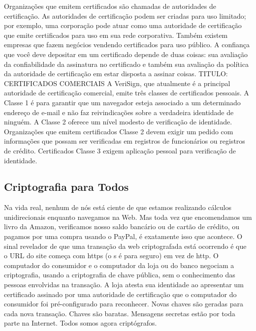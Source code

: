 \documentclass{book}
\begin{document}
Organizações que emitem certificados são chamadas de autoridades de certificação. As autoridades de certificação podem ser criadas para uso limitado; por exemplo, uma corporação pode atuar como uma autoridade de certificação que emite certificados para uso em sua rede corporativa. Também existem empresas que fazem negócios vendendo certificados para uso público. A confiança que você deve depositar em um certificado depende de duas coisas: sua avaliação da confiabilidade da assinatura no certificado e também sua avaliação da política da autoridade de certificação em estar disposta a assinar coisas.
TITULO: CERTIFICADOS COMERCIAIS
A VeriSign, que atualmente é a principal autoridade de certificação comercial, emite três classes de certificados pessoais. A Classe 1 é para garantir que um navegador esteja associado a um determinado endereço de e-mail e não faz reivindicações sobre a verdadeira identidade de ninguém. A Classe 2 oferece um nível modesto de verificação de identidade. Organizações que emitem certificados Classe 2 devem exigir um pedido com informações que possam ser verificadas em registros de funcionários ou registros de crédito. Certificados Classe 3 exigem aplicação pessoal para verificação de identidade.


\subsection{Criptografia para Todos}
\label{segredos:crip-todos}

Na vida real, nenhum de nós está ciente de que estamos realizando cálculos unidirecionais enquanto navegamos na Web. Mas toda vez que encomendamos um livro da Amazon, verificamos nosso saldo bancário ou de cartão de crédito, ou pagamos por uma compra usando o PayPal, é exatamente isso que acontece. O sinal revelador de que uma transação da web criptografada está ocorrendo é que o URL do site começa com https (o s é para seguro) em vez de http. O computador do consumidor e o computador da loja ou do banco negociam a criptografia, usando a criptografia de chave pública, sem o conhecimento das pessoas envolvidas na transação. A loja atesta sua identidade ao apresentar um certificado assinado por uma autoridade de certificação que o computador do consumidor foi pré-configurado para reconhecer. Novas chaves são geradas para cada nova transação. Chaves são baratas. Mensagens secretas estão por toda parte na Internet. Todos somos agora criptógrafos.
\end{document}
